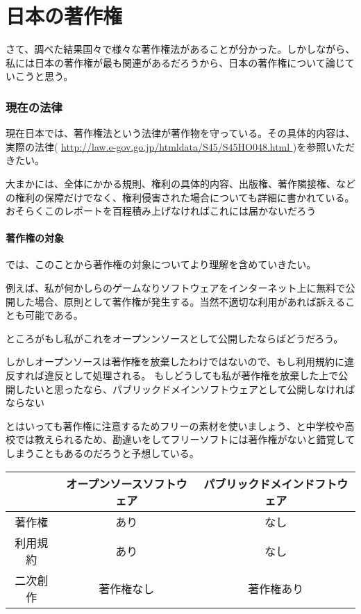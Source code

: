 \documentclass[a4j]{jsarticle}
\begin{document}
\part{日本の著作権}
さて、調べた結果国々で様々な著作権法があることが分かった。しかしながら、私には日本の著作権が最も関連があるだろうから、日本の著作権について論じていこうと思う。
\section*{現在の法律}
現在日本では、著作権法という法律が著作物を守っている。その具体的内容は、実際の法律( \url{ http://law.e-gov.go.jp/htmldata/S45/S45HO048.html } )を参照いただきたい。\par
大まかには、全体にかかる規則、権利の具体的内容、出版権、著作隣接権、などの権利の保障だけでなく、権利侵害された場合についても詳細に書かれている。おそらくこのレポートを百程積み上げなければこれには届かないだろう
\subsection*{著作権の対象}
では、このことから著作権の対象についてより理解を含めていきたい。\par
例えば、私が何かしらのゲームなりソフトウェアをインターネット上に無料で公開した場合、原則として著作権が発生する。当然不適切な利用があれば訴えることも可能である。\par
ところがもし私がこれをオープンンソースとして公開したならばどうだろう。\par
しかしオープンソースは著作権を放棄したわけではないので、もし利用規約に違反すれば違反として処理される。\cite{def_oss}
もしどうしても私が著作権を放棄した上で公開したいと思ったなら、パブリックドメインソフトウェアとして公開しなければならない \cite{def_pds} \par
 とはいっても著作権に注意するためフリーの素材を使いましょう、と中学校や高校では教えられるため、勘違いをしてフリーソフトには著作権がないと錯覚してしまうこともあるのだろうと予想している。\par
\begin{center}
 \begin{tabular}{|c|c|c|} %
  \hline
 &オープンソースソフトウェア &パブリックドメインドフトウェア \\ \hline
 著作権&あり &なし \\  \hline
 利用規約&あり &なし \\ \hline
 二次創作&著作権なし &著作権あり \\ \hline
 \end{tabular} \cite{def_diff}
 \end{center}
\end{document}
